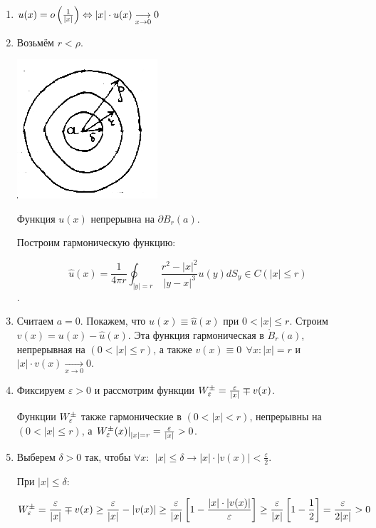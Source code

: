 \begin{enumerate}
\item{ 
	
	$u(x) = o \left(\frac{1}{|x|}\right) \Leftrightarrow |x| \cdot u(x) 
	\underset{x \to 0}{\longrightarrow} 0$
}

\item{
Возьмём $r<\rho$. 
\begin{center}
\includegraphics{22_1_new}
\end{center}
Функция $u(x)$ непрерывна на $\partial B_r (a)$.

Построим гармоническую функцию:

$$\hat{u}(x) = \frac{1}{4 \pi r} 
\oint_{|y|=r}\frac{r^2 - |x|^2}{|y-x|^3} u(y) dS_y \in 
C(|x| \le r)$$.

}


\item{

Считаем $a=0$. Покажем, что $u(x) \equiv \hat{u}(x)$ при $0<|x|\le r$. Строим $v(x) = u(x) - \hat{u}(x)$. Эта функция гармоническая в $\mathring{B}_r(a)$, непрерывная на $(0<|x| \le r)$, а также 
$v(x) \equiv 0 ~~ \forall x: |x|=r$ и $|x| \cdot v(x) \underset{x \to 0}{\longrightarrow} 0$. 
 
}

\item{

Фиксируем $\varepsilon >0$ и рассмотрим функции $W_\varepsilon^{\pm} =
\frac{\varepsilon}{|x|} \mp v(x)$.

Функции $W_\varepsilon^{\pm}$ также гармонические в $(0<|x|<r)$, непрерывны на $(0<|x| \le r)$, а 
$\left.W_\varepsilon^{\pm}(x) \right|_{|x|=r} =\frac{\varepsilon}{|x|} >0$.
}

\item{

Выберем $\delta > 0 $ так, чтобы $\forall x:~~ |x| \le \delta \to |x| \cdot |v(x)| < \frac{\varepsilon}{2}$.

При $|x|\le \delta$: 

$$
W_\varepsilon^{\pm} = \frac{\varepsilon}{|x|} \mp v(x) \ge 
\frac{\varepsilon}{|x|} - |v(x)|
\ge 
\frac{\varepsilon}{|x|}\left[1 - \frac{|x|\cdot |v(x)|}{\varepsilon}\right]
\ge
\frac{\varepsilon}{|x|}\left[1-\frac{1}{2}\right]
=
\frac{\varepsilon}{2|x|} >0
$$
}




\end{enumerate}
